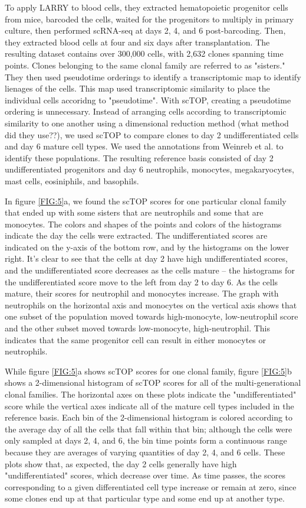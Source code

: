 \documentclass[aps,superscriptaddress, notitlepage,longbibliography]{revtex4-1}
\begin{document}
To apply LARRY to blood cells, they extracted hematopoietic progenitor cells from mice, barcoded the cells, waited for the progenitors to multiply in primary culture, then performed scRNA-seq at days 2, 4, and 6 post-barcoding. Then, they extracted blood cells at four and six days after transplantation. The resulting dataset contains over 300,000 cells, with 2,632 clones spanning time points. Clones belonging to the same clonal family are referred to as "sisters." They then used pseudotime orderings to identify a transcriptomic map to identify lienages of the cells. This map used transcriptomic similarity to place the individual cells accoridng to "pseudotime". With scTOP, creating a pseudotime ordering is unnecessary. Instead of arranging cells according to transcriptomic similarity to one another using a dimensional reduction method (what method did they use??), we used scTOP to compare clones to day 2 undifferentiated cells and day 6 mature cell types. We used the annotations from Weinreb et al. to identify these populations. The resulting reference basis consisted of day 2 undifferentiated progenitors and day 6 neutrophils, monocytes, megakaryocytes, mast cells, eosiniphils, and basophils. 

In figure \ref{FIG:5}a, we found the scTOP scores for one particular clonal family that ended up with some sisters that are neutrophils and some that are monocytes. The colors and shapes of the points and colors of the histograms indicate the day the cells were extracted. The undifferentiated scores are indicated on the y-axis of the bottom row, and by the histograms on the lower right. It's clear to see that the cells at day 2 have high undifferentiated scores, and the undifferentiated score decreases as the cells mature -- the histograms for the undifferentiated score move to the left from day 2 to day 6. As the cells mature, their scores for neutrophil and monocytes increase. The graph with neutrophils on the horizontal axis and monocytes on the vertical axis shows that one subset of the population moved towards high-monocyte, low-neutrophil score and the other subset moved towards low-monocyte, high-neutrophil. This indicates that the same progenitor cell can result in either monocytes or neutrophils.

While figure \ref{FIG:5}a shows scTOP scores for one clonal family, figure \ref{FIG:5}b shows a 2-dimensional histogram of scTOP scores for all of the multi-generational clonal families. The horizontal axes on these plots indicate the "undifferentiated" score while the vertical axes indicate all of the mature cell types included in the reference basis. Each bin of the 2-dimensional histogram is colored according to the average day of all the cells that fall within that bin; although the cells were only sampled at days 2, 4, and 6, the bin time points form a continuous range because they are averages of varying quantities of day 2, 4, and 6 cells. These plots show that, as expected, the day 2 cells generally have high "undifferentiated" scores, which decrease over time. As time passes, the scores corresponding to a given differentiated cell type increase or remain at zero, since some clones end up at that particular type and some end up at another type. 
\end{document}
